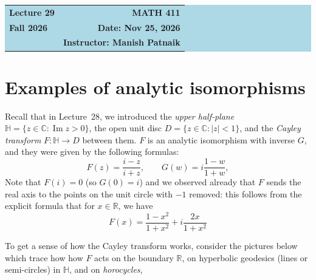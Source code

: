 \documentclass[11pt]{article}
\theoremstyle{plain}
\theoremstyle{definition}
\theoremstyle{boldremark}
\theoremstyle{remark}
\numberwithin{equation}{section}
\newcommand{\C}{\mathbb{C}}
\newcommand{\R}{\mathbb{R}}
\DeclareMathOperator{\Imag}{Im}
\begin{document}
\begin{center}
  \colorbox{lightblue}{%
    \begin{minipage}{0.94\textwidth}
      \vspace{0.55em}
      \begin{tabular*}{\textwidth}{@{\extracolsep{\fill}}lr}
        {\color{courseblue}\bfseries\LARGE Lecture 29} &
        {\color{courseblue}\bfseries\LARGE MATH 411}\\[0.35em]
        \textbf{Fall 2026} & \textbf{Date: Nov 25, 2026}\\
        & \textbf{Instructor: Manish Patnaik}
      \end{tabular*}
      \vspace{0.45em}
    \end{minipage}}
\end{center}

\setcounter{tocdepth}{1}
\tableofcontents
\vspace{0.45em}

\section{Examples of analytic isomorphisms}

Recall that in Lecture~28, we introduced the \emph{upper half-plane}
$\mathbb H=\{z\in\C:\Imag z>0\}$, the open unit disc
$D=\{z\in\C:|z|<1\}$, and the \emph{Cayley transform} $F: \mathbb H \rightarrow D$ between them. $F$ is an analytic isomorphism with inverse $G$, and they were given by the following formulas:
\[
 F(z)=\frac{i-z}{i+z},\qquad G(w)=i\frac{1-w}{1+w},
\]
Note that $F(i)=0$ (so $G(0)=i$) and we observed already that $F$ sends the real axis to the points on the unit circle with $-1$ removed: this follows from the explicit formula that for $x \in \R$, we have \[ F(x)=\frac{1-x^2}{1+x^2}+i\frac{2x}{1+x^2} \] 


To get a sense of how the Cayley transform works, consider the pictures below which trace how how $F$ acts on the boundary $\R$, on hyperbolic
geodesics (lines or semi-circles) in $\mathbb H$, and on \textit{horocycles},
\end{document}
